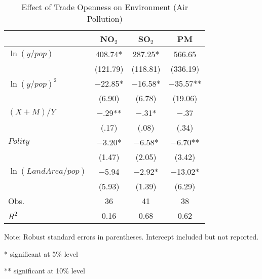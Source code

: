 \documentclass{article}
\begin{document}
\begin{table}[htbp] 
	\centering\small
	\begin{threeparttable}
		\caption{\label{tab:results}Effect of Trade Openness on Environment (Air Pollution)}
		\begin{tabular}{lccc}
			\toprule & NO$_2$ & SO$_2$ & PM \\ 
			\midrule $\ln(y/pop)$ & 408.74* & 287.25* & 566.65 \\ 
			& (121.79) & (118.81) & (336.19) \\ 
			$\ln(y/pop)^2$ & $-$22.85* & $-$16.58* & $-$35.57** \\
			& (6.90) & (6.78) & (19.06) \\
			$(X+M)/Y$ & $-$.29** & $-$.31* & $-$.37 \\
			& (.17) & (.08) & (.34) \\ 
			$Polity$ & $-$3.20* & $-$6.58* & $-$6.70** \\
			& (1.47) & (2.05) & (3.42) \\
			$\ln(LandArea/pop)$ & $-$5.94 & $-$2.92* & $-$13.02* \\
			& (5.93) & (1.39) & (6.29) \\ Obs. & 36 & 41 & 38 \\ 
			$R^2$ & 0.16 & 0.68 & 0.62 \\
			\bottomrule 
		\end{tabular} 
		\small Note: Robust standard errors in parentheses. Intercept included but not reported. 
			\begin{tablenotes} 
				\item[*] significant at 5\% level 
				\item[**] significant at 10\% level
			\end{tablenotes}
	\end{threeparttable} 
\end{table}
\end{document}
